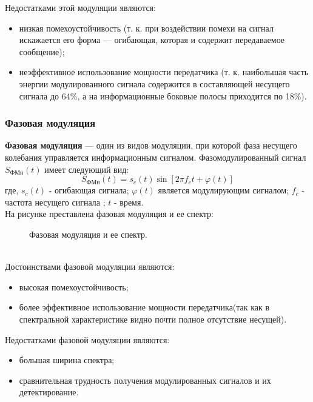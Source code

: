 Недостатками этой модуляции являются:
\begin{itemize}
	\item низкая помехоустойчивость (т. к. при воздействии помехи на сигнал искажается его форма — огибающая, которая и содержит передаваемое сообщение);
	\item неэффективное использование мощности передатчика (т. к. наибольшая часть энергии модулированного сигнала содержится в составляющей несущего сигнала до 64\%, а на информационные боковые полосы приходится по 18\%).
\end{itemize}

\subsubsection{Фазовая модуляция}
{\bf Фазовая модуляция} — один из видов модуляции, при которой фаза несущего колебания управляется информационным сигналом. Фазомодулированный сигнал $S_{ФМн}(t)$ имеет следующий вид: $$S_{ФМн}(t)=s_c(t)\sin[2\pi f_ct + \varphi(t)]$$ где, $s_c(t)$ - огибающая сигнала; $\varphi(t)$ является модулирующим сигналом; $f_c$ - частота несущего сигнала ; $t$ - время.\\
На рисунке преставлена фазовая модуляция и ее спектр:
\begin{figure}[h]
\caption{Фазовая модуляция и ее спектр.}
\label{fig:image}
\end{figure}
\\
Достоинствами фазовой модуляции являются:
\begin{itemize}
	\item высокая помехоустойчивость;
	\item более эффективное использование мощности передатчика(так как в спектральной характеристике видно почти полное отсутствие несущей).
\end{itemize}
Недостатками фазовой модуляции являются:
\begin{itemize}
	\item большая ширина спектра;
	\item сравнительная трудность получения модулированных сигналов и их детектирование.
\end{itemize}

